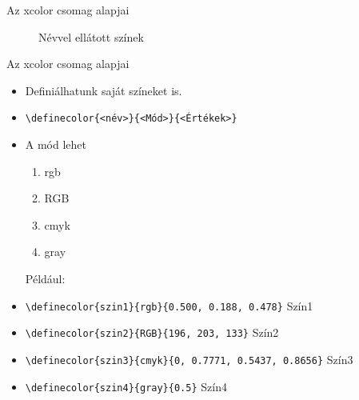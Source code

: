 \documentclass[aspectratio=1610,dvipsnames,xcolor=table]{beamer}
\begin{document}
\begin{frame}[fragile]{Az xcolor csomag alapjai}
\begin{minipage}{0.35\textwidth}
\begin{figure}
                \caption{Névvel ellátott színek}
            \end{figure}
        \end{minipage}
    \end{frame}

    \begin{frame}[fragile]{Az xcolor csomag alapjai}
        \begin{minipage}{0.8\textwidth}
            \begin{itemize}
                \item {}Definiálhatunk saját színeket is.
                \item {}\verb!\definecolor{<név>}{<Mód>}{<Értékek>}!
                \item {}A mód lehet
                \begin{enumerate}
                    \item {}rgb
                    \item {}RGB
                    \item {}cmyk
                    \item {}gray    
                \end{enumerate}
                Például:
                \item {}\verb!\definecolor{szin1}{rgb}{0.500, 0.188, 0.478}! 						\hfill \textcolor{szin1}{Szín1}
                \item {}\verb!\definecolor{szin2}{RGB}{196, 203, 133}! \hfill 					\textcolor{szin2}{Szín2}
                \item {}\verb!\definecolor{szin3}{cmyk}{0, 0.7771, 0.5437, 0.8656}! \hfill \textcolor{szin3}{Szín3}
                \item {}\verb!\definecolor{szin4}{gray}{0.5}! \hfill 								\textcolor{szin4}{Szín4}
            \end{itemize}
                                                        
        \end{minipage} 
        
    \end{frame}
    
\end{document}
